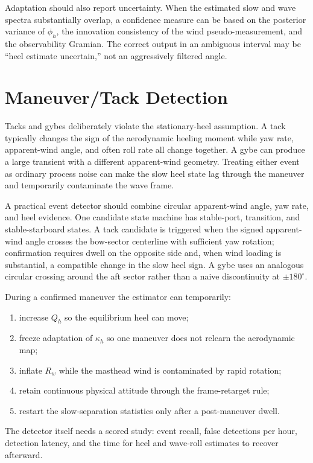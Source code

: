 \documentclass[conference]{IEEEtran}
\begin{document}
Adaptation should also report uncertainty. When the estimated slow and wave spectra
substantially overlap, a confidence measure can be based on the posterior variance of
$\phi_h$, the innovation consistency of the wind pseudo-measurement, and the observability
Gramian. The correct output in an ambiguous interval may be ``heel estimate uncertain,''
not an aggressively filtered angle.

\section{Maneuver/Tack Detection}
\label{sec:maneuvers}

Tacks and gybes deliberately violate the stationary-heel assumption. A tack typically
changes the sign of the aerodynamic heeling moment while yaw rate, apparent-wind angle,
and often roll rate all change together. A gybe can produce a large transient with a
different apparent-wind geometry. Treating either event as ordinary process noise can
make the slow heel state lag through the maneuver and temporarily contaminate the wave
frame.

A practical event detector should combine circular apparent-wind angle, yaw rate, and
heel evidence. One candidate state machine has stable-port, transition, and
stable-starboard states. A tack candidate is triggered when the signed apparent-wind
angle crosses the bow-sector centerline with sufficient yaw rotation; confirmation
requires dwell on the opposite side and, when wind loading is substantial, a compatible
change in the slow heel sign. A gybe uses an analogous circular crossing around the aft
sector rather than a naive discontinuity at $\pm180^\circ$.

During a confirmed maneuver the estimator can temporarily:
\begin{enumerate}
 \item increase $Q_h$ so the equilibrium heel can move;
 \item freeze adaptation of $\kappa_h$ so one maneuver does not relearn the aerodynamic map;
 \item inflate $R_w$ while the masthead wind is contaminated by rapid rotation;
 \item retain continuous physical attitude through the frame-retarget rule;
 \item restart the slow-separation statistics only after a post-maneuver dwell.
\end{enumerate}
The detector itself needs a scored study: event recall, false detections per hour,
detection latency, and the time for heel and wave-roll estimates to recover afterward.
\end{document}
